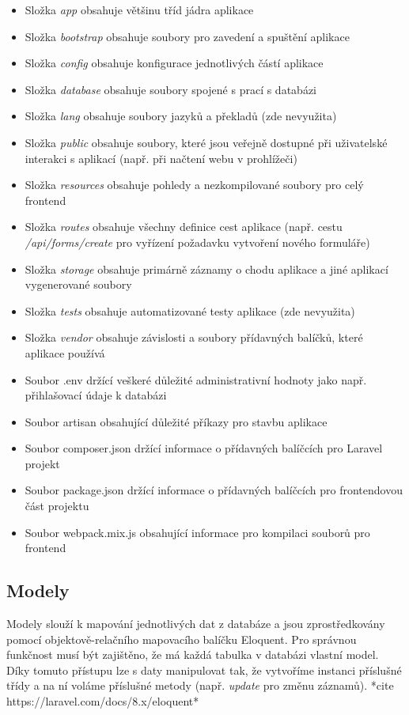 	\begin{itemize}
		\item Složka \textit{app} obsahuje většinu tříd jádra aplikace
		\item Složka \textit{bootstrap} obsahuje soubory pro zavedení a spuštění aplikace
		\item Složka \textit{config} obsahuje konfigurace jednotlivých částí aplikace
		\item Složka \textit{database} obsahuje soubory spojené s prací s databázi
		\item Složka \textit{lang} obsahuje soubory jazyků a překladů (zde nevyužita)
		\item Složka \textit{public} obsahuje soubory, které jsou veřejně dostupné při uživatelské interakci s aplikací (např. při načtení webu v prohlížeči)
		\item Složka \textit{resources} obsahuje pohledy a nezkompilované soubory pro celý frontend
		\item Složka \textit{routes} obsahuje všechny definice cest aplikace (např. cestu \textit{/api/forms/create} pro vyřízení požadavku vytvoření nového formuláře)
		\item Složka \textit{storage} obsahuje primárně záznamy o chodu aplikace a jiné aplikací vygenerované soubory
		\item Složka \textit{tests} obsahuje automatizované testy aplikace (zde nevyužita)
		\item Složka \textit{vendor} obsahuje závislosti a soubory přídavných balíčků, které aplikace používá 
		\item Soubor .env držící veškeré důležité administrativní hodnoty jako např. přihlašovací údaje k databázi
		\item Soubor artisan obsahující důležité příkazy pro stavbu aplikace \cite{LaravelArtisan}
		\item Soubor composer.json držící informace o přídavných balíčcích pro Laravel projekt \cite{ComposerpJSON}
		\item Soubor package.json držící informace o přídavných balíčcích pro frontendovou část projektu \cite{NPMpJSON}
		\item Soubor webpack.mix.js obsahující informace pro kompilaci souborů pro frontend \cite{LaravelJSCSS}
	\end{itemize} \cite{LaravelDir}

	\subsection{Modely}
	Modely slouží k mapování jednotlivých dat z databáze a jsou zprostředkovány pomocí objektově-relačního mapovacího balíčku Eloquent. Pro správnou funkčnost musí být zajištěno, že má každá tabulka v databázi vlastní model. Díky tomuto přístupu lze s daty manipulovat tak, že vytvoříme instanci příslušné třídy a na ní voláme příslušné metody (např. \textit{update} pro změnu záznamů). *cite https://laravel.com/docs/8.x/eloquent*
	

